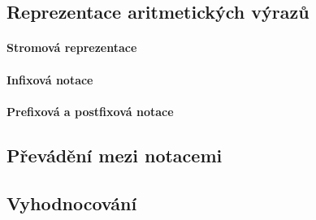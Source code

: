 \begin{todo}
\subsection{Reprezentace aritmetických výrazů}
\paragraph{Stromová reprezentace}
\paragraph{Infixová notace}
\paragraph{Prefixová a postfixová notace}
\subsection{Převádění mezi notacemi}
\subsection{Vyhodnocování}
\end{todo}
\ifx\ucebnice\undefined

\fi
